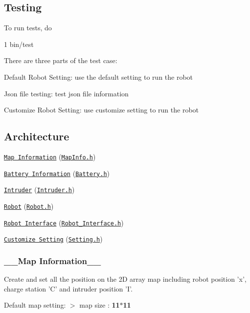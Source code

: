 \subsection*{Testing }

To run tests, do 
\begin{DoxyCode}
1 bin/test
\end{DoxyCode}


There are three parts of the test case\+:


\begin{DoxyEnumerate}
\item Default Robot Setting\+: use the default setting to run the robot
\item Json file testing\+: test json file information
\item Customize Robot Setting\+: use customize setting to run the robot
\end{DoxyEnumerate}

\subsection*{Architecture }


\begin{DoxyItemize}
\item \href{#mpinfo}{\tt Map Information} (\href{mapInfo.h}{\tt Map\+Info.\+h})
\item \href{#battery}{\tt Battery Information} (\href{battery.h}{\tt Battery.\+h})
\item \href{#intruder}{\tt Intruder} (\href{intruder.h}{\tt Intruder.\+h})
\item \href{#robot}{\tt Robot} (\href{robot.h}{\tt Robot.\+h})
\item \href{#ui}{\tt Robot Interface} (\href{robot_interface.h}{\tt Robot\+\_\+\+Interface.\+h})
\item \href{#setting}{\tt Customize Setting} (\href{setting.h}{\tt Setting.\+h}) 

 \subsubsection*{\+\_\+\+\_\+\+Map Information\+\_\+\+\_\+}
\end{DoxyItemize}

Create and set all the position on the 2\+D array map including robot position 'x', charge station 'C' and intruder position 'I'.

Default map setting\+: $>$ map size \+: {\bfseries 11$\ast$11}


